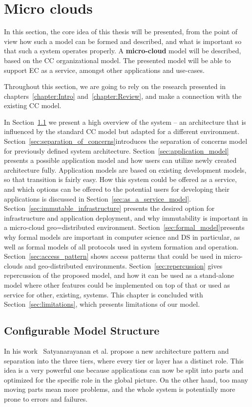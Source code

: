 \chapter{Micro clouds}\label{chapter:Micro_clouds}
%
In this section, the core idea of this thesis will be presented, from the point of view how such a model can be formed and described, and what is important so that such a system operates properly. A \textbf{micro-cloud} model will be described, based on the CC organizational model.  The presented model will be able to support EC as a service, amongst other applications and use-cases. 

Throughout this section, we are going to rely on the research presented in chapters~\ref{chapter:Intro} and~\ref{chapter:Review}, and make a connection with the existing CC model.

In Section~\ref{sec:configurable_model_structure} we present a high overview of the system -- an architecture that is influenced by the standard CC model but adapted for a different environment. Section~\ref{sec:separation_of_concerns}introduces the separation of concerns model for previously defined system architecture. Section~\ref{sec:application_model} presents a possible application model and how users can utilize newly created architecture fully. Application models are based on existing development models, so that transition is fairly easy. How this system could be offered as a service, and which options can be offered to the potential users for developing their applications is discussed in Section~\ref{sec:as_a_service_model}. Section~\ref{sec:immutable_infrastructure} presents the desired option for infrastructure and application deployment, and why immutability is important in a micro-cloud geo=distributed environment. Section~\ref{sec:formal_model}presents why formal models are important in computer science and DS in particular, as well as formal models of all protocols used in system formation and operation. Section~\ref{sec:access_pattern} shows access patterns that could be used in micro-clouds and geo-distributed environments. Section~\ref{sec:repercussion} gives repercussion of the proposed model, and how it can be used as a stand-alone model where other features could be implemented on top of that or used as service for other, existing, systems. This chapter is concluded with Section~\ref{sec:limitations}, which presents limitations of our model.
%
%
\section{Configurable Model Structure}\label{sec:configurable_model_structure}
%
In his work~\cite{SatyanarayananK19} Satyanarayanan et al. propose a new architecture pattern and separation into the three tiers, where every tier or layer has a distinct role. This idea is a very powerful one because applications can now be split into parts and optimized for the specific role in the global picture. On the other hand, too many moving parts mean more problems, and the whole system is potentially more prone to errors and failures.

